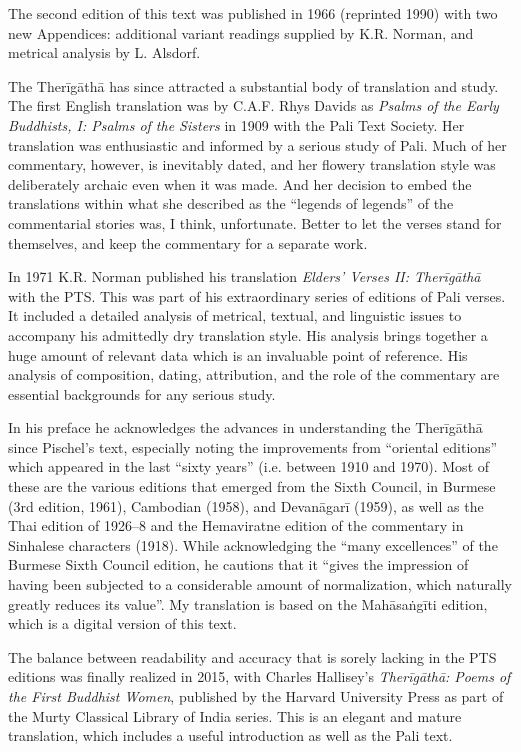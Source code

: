 \documentclass[12pt,openany]{book}%
\begin{document}
The second edition of this text was published in 1966 (reprinted 1990) with two new Appendices: additional variant readings supplied by K.R. Norman, and metrical analysis by L. Alsdorf.

The \textsanskrit{Therīgāthā} has since attracted a substantial body of translation and study. The first English translation was by C.A.F. Rhys Davids as \textit{Psalms of the Early Buddhists, I: Psalms of the Sisters} in 1909 with the Pali Text Society. Her translation was enthusiastic and informed by a serious study of Pali. Much of her commentary, however, is inevitably dated, and her flowery translation style was deliberately archaic even when it was made. And her decision to embed the translations within what she described as the “legends of legends” of the commentarial stories was, I think, unfortunate. Better to let the verses stand for themselves, and keep the commentary for a separate work.

In 1971 K.R. Norman published his translation \textit{Elders’ Verses II: \textsanskrit{Therīgāthā}} with the PTS. This was part of his extraordinary series of editions of Pali verses. It included a detailed analysis of metrical, textual, and linguistic issues to accompany his admittedly dry translation style. His analysis brings together a huge amount of relevant data which is an invaluable point of reference. His analysis of composition, dating, attribution, and the role of the commentary are essential backgrounds for any serious study.

In his preface he acknowledges the advances in understanding the \textsanskrit{Therīgāthā} since Pischel’s text, especially noting the improvements from “oriental editions” which appeared in the last “sixty years” (i.e. between 1910 and 1970). Most of these are the various editions that emerged from the Sixth Council, in Burmese (3rd edition, 1961), Cambodian (1958), and \textsanskrit{Devanāgarī} (1959), as well as the Thai edition of 1926–8 and the Hemaviratne edition of the commentary in Sinhalese characters (1918). While acknowledging the “many excellences” of the Burmese Sixth Council edition, he cautions that it “gives the impression of having been subjected to a considerable amount of normalization, which naturally greatly reduces its value”. My translation is based on the  \textsanskrit{Mahāsaṅgīti} edition, which is a digital version of this text.

The balance between readability and accuracy that is sorely lacking in the PTS editions was finally realized in 2015, with Charles Hallisey’s \textit{\textsanskrit{Therīgāthā}: Poems of the First Buddhist Women}, published by the Harvard University Press as part of the Murty Classical Library of India series. This is an elegant and mature translation, which includes a useful introduction as well as the Pali text.
\end{document}
